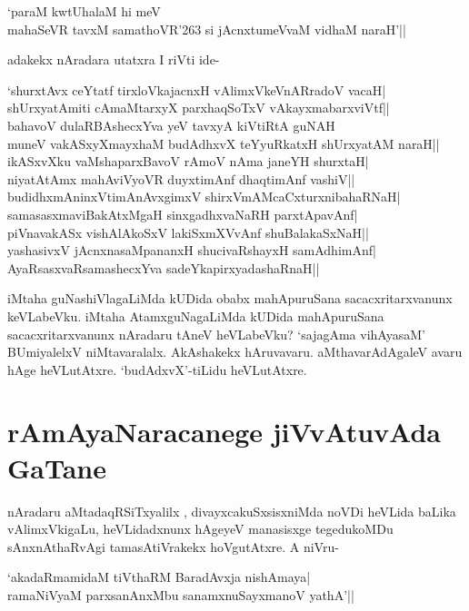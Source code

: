 \begin{shloka} 
`paraM kwtUhalaM hi meV\label{163}\\ 
mahaSeVR tavxM samathoVR\char'263 si jAcnxtumeVvaM vidhaM naraH'|| 
\end{shloka} 

adakekx nAradara utatxra I riVti ide- 

\begin{shloka}
`shurxtAvx ceYtatf tirxloVkajacnxH vAlimxVkeVnARradoV vacaH|\label{163d}\\ 
shUrxyatAmiti cAmaMtarxyX parxhaqSoTxV vAkayxmabarxviVtf||\\ 
bahavoV dulaRBAshecxYva yeV tavxyA kiVtiRtA guNAH\label{163a}\\ 
muneV vakASxyXmayxhaM budAdhxvX teYyuRkatxH shUrxyatAM naraH||\\ 
ikASxvXku vaMshaparxBavoV rAmoV nAma janeYH shurxtaH|\label{163aa}\\ 
niyatAtAmx mahAviVyoVR duyxtimAnf dhaqtimAnf vashiV||\\ 
budidhxmAninxVtimAnAvxgimxV shirxVmAMcaCxturxnibahaRNaH|\\ 
samasasxmaviBakAtxMgaH sinxgadhxvaNaRH parxtApavAnf|\\ 
piVnavakASx vishAlAkoSxV lakiSxmXVvAnf shuBalakaSxNaH||\\ 
yashasivxV jAcnxnasaMpananxH shucivaRshayxH samAdhimAnf|\\ 
AyaRsasxvaRsamashecxYva sadeYkapirxyadashaRnaH||
\end{shloka} 

iMtaha guNashiVlagaLiMda kUDida obabx mahApuruSana sacacxritarxvanunx keVLabeVku. iMtaha AtamxguNagaLiMda kUDida mahApuruSana sacacxritarxvanunx nAradaru tAneV heVLabeVku? `sajagAma vihAyasaM'\label{163c} BUmiyalelxV niMtavaralalx. AkAshakekx hAruvavaru. aMthavarAdAgaleV avaru hAge heVLutAtxre. `budAdxvX'-tiLidu heVLutAtxre. 

\section*{rAmAyaNaracanege jiVvAtuvAda GaTane} 

nAradaru aMtadaqRSiTxyalilx , divayxcakuSxsisxniMda noVDi heVLida baLika vAlimxVkigaLu, heVLidadxnunx hAgeyeV manasisxge tegedukoMDu sAnxnAthaRvAgi tamasAtiVrakekx hoVgutAtxre. A niVru- 

\begin{shloka} 
`akadaRmamidaM tiVthaRM BaradAvxja nishAmaya|\label{164}\\ 
ramaNiVyaM parxsanAnxMbu sanamxnuSayxmanoV yathA'||
\end{shloka} 

